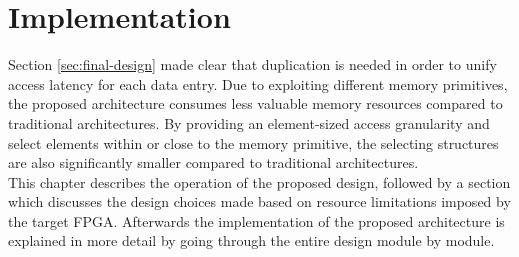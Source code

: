 \chapter{Implementation}
Section \ref{sec:final-design} made clear that duplication is needed in order to unify access latency for each data entry. Due to exploiting different memory primitives, the proposed architecture consumes less valuable memory resources compared to traditional architectures. By providing an element-sized access granularity and select elements within or close to the memory primitive, the selecting structures are also significantly smaller compared to traditional architectures.\\
This chapter describes the operation of the proposed design, followed by a section which discusses the design choices made based on resource limitations imposed by the target FPGA. Afterwards the implementation of the proposed architecture is explained in more detail by going through the entire design module by module.



